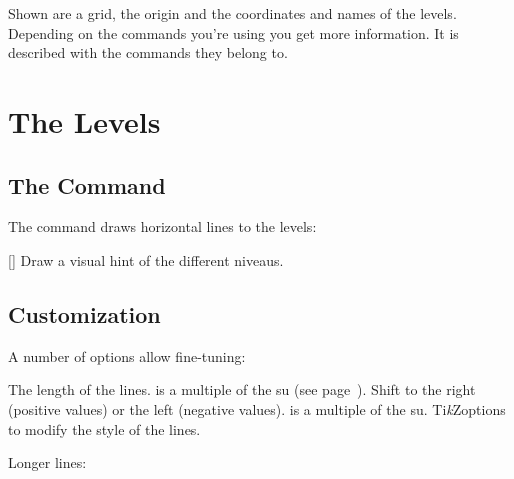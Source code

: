 \documentclass[load-preamble+]{cnltx-doc}
\newcommand*\TikZ{Ti\textit{k}Z}
\begin{document}
\begin{example}
  \begin{endiagram}[debug]
  \end{endiagram}
  \quad
  \begin{endiagram}[debug,unit=2em]
  \end{endiagram}
\end{example}
Shown are a grid, the origin and the coordinates and names of the levels.
Depending on the commands you're using you get more information.  It is
described with the commands they belong to.

\section{The Levels}
\subsection{The  Command}
The command  draws horizontal lines to the levels:
\begin{commands}
  []
    Draw a visual hint of the different niveaus.
\end{commands}

\begin{example}
  \begin{endiagram}
    \ShowNiveaus
  \end{endiagram}
\end{example}

\subsection{Customization}

A number of options allow fine-tuning:
\begin{options}
    The length of the lines.  is a multiple of the \ac{su} (see
    page~\pageref{key:unit}).
    Shift to the right (positive values) or the left (negative values).
     is a multiple of the \ac{su}.
  \Default
    \TikZ options to modify the style of the lines.
\end{options}

Longer lines:
\begin{example}
  \begin{endiagram}
    \ShowNiveaus[length=2]
  \end{endiagram}
\end{example}
\end{document}
